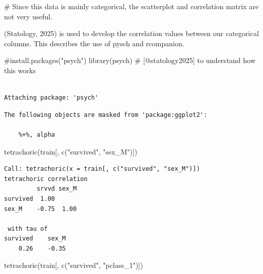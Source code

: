 \documentclass[
  letterpaper,
  DIV=11,
  numbers=noendperiod]{scrartcl}
\newenvironment{Shaded}{\begin{snugshade}}{\end{snugshade}}
\newcommand{\CommentTok}[1]{\textcolor[rgb]{0.37,0.37,0.37}{#1}}
\newcommand{\FunctionTok}[1]{\textcolor[rgb]{0.28,0.35,0.67}{#1}}
\newcommand{\NormalTok}[1]{\textcolor[rgb]{0.00,0.23,0.31}{#1}}
\newcommand{\StringTok}[1]{\textcolor[rgb]{0.13,0.47,0.30}{#1}}
\begin{document}
\begin{Shaded}
\begin{Highlighting}[]
\CommentTok{\# Since this data is mainly categorical, the scatterplot and correlation matrix are not very useful.}
\end{Highlighting}
\end{Shaded}

(Statology, 2025) is used to develop the correlation values between our
categorical columns. This describes the use of pysch and rcompanion.

\begin{Shaded}
\begin{Highlighting}[]
\CommentTok{\#install.packages("psych")}
\FunctionTok{library}\NormalTok{(psych) }\CommentTok{\# [@statology2025] to understand how this works}
\end{Highlighting}
\end{Shaded}

\begin{verbatim}

Attaching package: 'psych'
\end{verbatim}

\begin{verbatim}
The following objects are masked from 'package:ggplot2':

    %+%, alpha
\end{verbatim}

\begin{Shaded}
\begin{Highlighting}[]
\FunctionTok{tetrachoric}\NormalTok{(train[, }\FunctionTok{c}\NormalTok{(}\StringTok{"survived"}\NormalTok{, }\StringTok{"sex\_M"}\NormalTok{)])}
\end{Highlighting}
\end{Shaded}

\begin{verbatim}
Call: tetrachoric(x = train[, c("survived", "sex_M")])
tetrachoric correlation 
         srvvd sex_M
survived  1.00      
sex_M    -0.75  1.00

 with tau of 
survived    sex_M 
    0.26    -0.35 
\end{verbatim}

\begin{Shaded}
\begin{Highlighting}[]
\FunctionTok{tetrachoric}\NormalTok{(train[, }\FunctionTok{c}\NormalTok{(}\StringTok{"survived"}\NormalTok{, }\StringTok{"pclass\_1"}\NormalTok{)])}
\end{Highlighting}
\end{Shaded}
\end{document}
